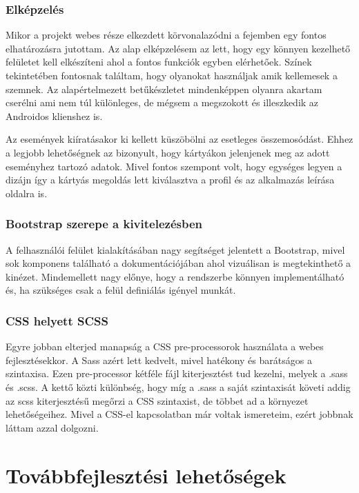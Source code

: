 \documentclass[
]{thesis-ekf}
\theoremstyle{definition}
\theoremstyle{remark}
\begin{document}
\subsection{Elképzelés}
Mikor a projekt webes része elkezdett körvonalazódni a fejemben egy fontos elhatározásra jutottam. Az alap elképzelésem az lett, hogy egy könnyen kezelhető felületet kell elkészíteni ahol a fontos funkciók egyben elérhetőek. Színek tekintetében fontosnak találtam, hogy olyanokat használjak amik kellemesek a szemnek. Az alapértelmezett betűkészletet mindenképpen olyanra akartam cserélni ami nem túl különleges, de mégsem a megszokott és illeszkedik az Androidos klienshez is.

Az események kiíratásakor ki kellett küszöbölni az esetleges összemosódást. Ehhez a legjobb lehetőségnek az bizonyult, hogy kártyákon jelenjenek meg az adott eseményhez tartozó adatok. Mivel fontos szempont volt, hogy egységes legyen a dizájn így a kártyás megoldás lett kiválasztva a profil és az alkalmazás leírása oldalra is. 

\subsection{Bootstrap szerepe a kivitelezésben}

A felhasználói felület kialakításában nagy segítséget jelentett a Bootstrap, mivel sok komponens található a dokumentációjában ahol vizuálisan is megtekinthető a kinézet. Mindemellett nagy előnye, hogy a rendszerbe könnyen implementálható és, ha szükséges csak a felül definiálás igényel munkát.

\subsection{CSS helyett SCSS}

Egyre jobban elterjed manapság a CSS pre-processorok használata a webes fejlesztésekkor. A Sass azért lett kedvelt, mivel hatékony és barátságos a szintaxisa. Ezen pre-processor kétféle fájl kiterjesztést tud kezelni, melyek a .sass és .scss. A kettő közti különbség, hogy míg a .sass a saját szintaxisát követi addig az scss kiterjesztésű megőrzi a CSS szintaxist, de többet ad a környezet lehetőségeihez. Mivel a CSS-el kapcsolatban már voltak ismereteim, ezért jobbnak láttam azzal dolgozni. 

\chapter{Továbbfejlesztési lehetőségek}
\end{document}
